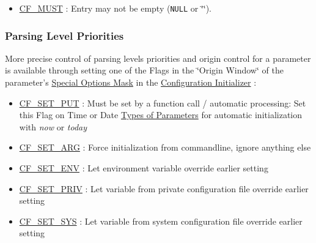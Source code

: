 \begin{itemize}
\item \hyperlink{group__special__options__mask_g3229f5b038eaa0c6428361d2aa510dfc}{CF\_\-MUST} : Entry may not be empty ({\tt NULL} or \char`\"{}\char`\"{}). \end{itemize}
\hypertarget{config_levels_parsing_level_priorities}{}\subsubsection{Parsing Level Priorities}\label{config_levels_parsing_level_priorities}
More precise control of parsing levels priorities and origin control for a parameter is available through setting one of the Flags in the \char`\"{}Origin Window\char`\"{} of the parameter's \hyperlink{group__special__options__mask}{Special Options Mask} in the \hyperlink{config_initializer}{Configuration Initializer} :

\begin{itemize}
\item \hyperlink{group__special__options__mask_g8d6cd1608fef5638efe964da63edf2dd}{CF\_\-SET\_\-PUT} : Must be set by a function call / automatic processing: Set this Flag on Time or Date \hyperlink{parameter_types}{Types of Parameters} for automatic initialization with {\em now\/} or {\em today\/} \end{itemize}


\begin{itemize}
\item \hyperlink{group__special__options__mask_g1b3eb474a5160e5a32385f6de53d90d6}{CF\_\-SET\_\-ARG} : Force initialization from commandline, ignore anything else\end{itemize}


\begin{itemize}
\item \hyperlink{group__special__options__mask_g29dbd098a75a23ddc42b3b53e430d694}{CF\_\-SET\_\-ENV} : Let environment variable override earlier setting\end{itemize}


\begin{itemize}
\item \hyperlink{group__special__options__mask_gabf1d4d312964af93bd55f71eeec6988}{CF\_\-SET\_\-PRIV} : Let variable from private configuration file override earlier setting\end{itemize}


\begin{itemize}
\item \hyperlink{group__special__options__mask_g8fe09807491ee119290329cf08e6f340}{CF\_\-SET\_\-SYS} : Let variable from system configuration file override earlier setting\end{itemize}


